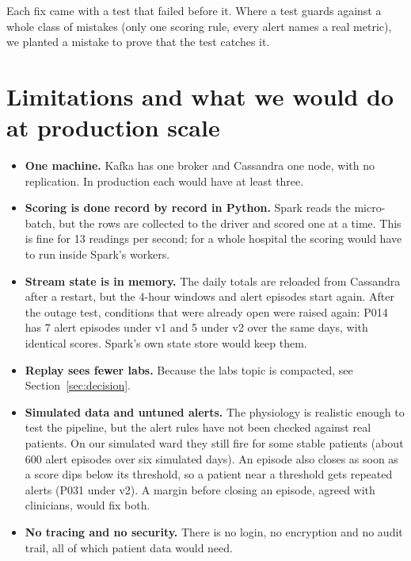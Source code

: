 \documentclass[11pt,a4paper]{article}
\begin{document}
Each fix came with a test that failed before it. Where a test guards against a whole
class of mistakes (only one scoring rule, every alert names a real metric), we planted a
mistake to prove that the test catches it.

\section{Limitations and what we would do at production scale}

\begin{itemize}
  \item \textbf{One machine.} Kafka has one broker and Cassandra one node, with no
  replication. In production each would have at least three.
  \item \textbf{Scoring is done record by record in Python.} Spark reads the
  micro-batch, but the rows are collected to the driver and scored one at a time. This
  is fine for 13 readings per second; for a whole hospital the scoring would have to run
  inside Spark's workers.
  \item \textbf{Stream state is in memory.} The daily totals are reloaded from
  Cassandra after a restart, but the 4-hour windows and alert episodes start again. After
  the outage test, conditions that were already open were raised again: P014 has 7 alert
  episodes under v1 and 5 under v2 over the same days, with identical scores. Spark's own
  state store would keep them.
  \item \textbf{Replay sees fewer labs.} Because the labs topic is compacted, see
  Section~\ref{sec:decision}.
  \item \textbf{Simulated data and untuned alerts.} The physiology is realistic enough
  to test the pipeline, but the alert rules have not been checked against real
  patients. On our simulated ward they still fire for some stable patients (about 600
  alert episodes over six simulated days). An episode also closes as soon as a score dips
  below its threshold, so a patient near a threshold gets repeated alerts (P031 under
  v2). A margin before closing an episode, agreed with clinicians, would fix both.
  \item \textbf{No tracing and no security.} There is no login, no encryption and no
  audit trail, all of which patient data would need.
\end{itemize}
\end{document}
